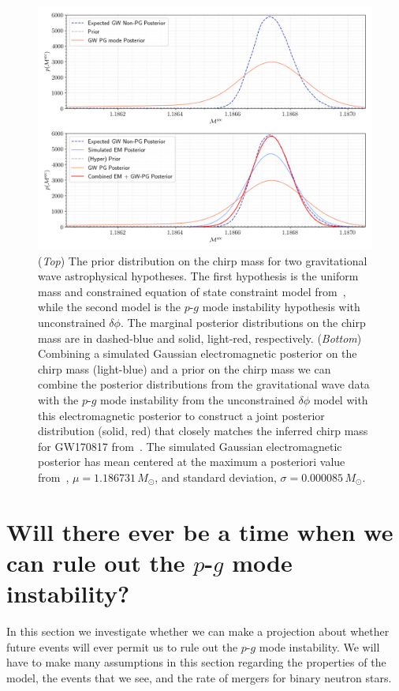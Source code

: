 \begin{figure}[th]
\centering
\includegraphics[width=0.9\columnwidth]{figs/chapter6/em_posterior_fix.png}
\caption{(\textit{Top}) The prior distribution on the chirp mass for two gravitational wave astrophysical hypotheses. The first hypothesis is the uniform mass and constrained equation of state constraint model from~\cite{de2018tidal}, while the second model is the $p$-$g$ mode instability hypothesis with unconstrained $\delta \phi$. The marginal posterior distributions on the chirp mass are in dashed-blue and solid, light-red, respectively. (\textit{Bottom}) Combining a simulated Gaussian electromagnetic posterior on the chirp mass (light-blue) and a prior on the chirp mass we can combine the posterior distributions from the gravitational wave data with the $p$-$g$ mode instability from the unconstrained $\delta \phi$ model with this electromagnetic posterior to construct a joint posterior distribution (solid, red) that closely matches the inferred chirp mass for GW170817 from~\cite{de2018tidal}. The simulated Gaussian electromagnetic posterior has mean centered at the maximum a posteriori value from~\cite{de2018tidal}, $\mu = 1.186731 \, M_\odot$, and standard deviation, $\sigma = 0.000085 \, M_\odot$.}
\label{fig:em_posterior_analysis}
\end{figure}

\section{Will there ever be a time when we can rule out the $p$-$g$ mode instability?}
In this section we investigate whether we can make a projection about whether future events will ever permit us to rule out the $p$-$g$ mode instability. We will have to make many assumptions in this section regarding the properties of the model, the events that we see, and the rate of mergers for binary neutron stars.

